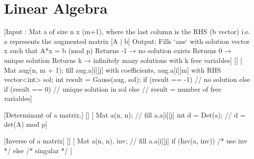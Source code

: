\chapter{Linear Algebra}

[Input : Mat a of size n x (m+1), where the last column is the RHS (b vector)
         i.e. a represents the augmented matrix [A | b]
 Output: Fills `ans` with solution vector x such that A*x = b (mod p)
         Returns -1  → no solution exists
         Returns  0  → unique solution
         Returns  k  → infinitely many solutions with k free variables]
[]
[  Mat aug(n, m + 1);
   fill aug.a[i][j] with coefficients, aug.a[i][m] with RHS
   vector<int> sol;
   int result = Gauss(aug, sol);
   if (result == -1)     // no solution
   else if (result == 0) // unique solution in sol
   else                  // result = number of free variables]

[Determinant of a matrix.]
[]
[
Mat a(n, n);
// fill a.a[i][j]
int d = Det(a);   // d = det(A) mod p]

[Inverse of a matrix]
[]
[
Mat a(n, n), inv;
// fill a.a[i][j]
if (Inv(a, inv)) { /* use inv */ }
else             { /* singular */ }
]